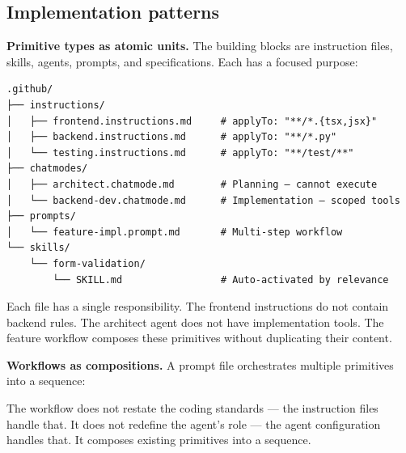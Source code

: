 \documentclass[
  a4paper,
  DIV=11,
  numbers=noendperiod]{scrreprt}
\newenvironment{Shaded}{\begin{snugshade}}{\end{snugshade}}
\newcommand{\CommentTok}[1]{\textcolor[rgb]{0.37,0.37,0.37}{#1}}
\newcommand{\FunctionTok}[1]{\textcolor[rgb]{0.28,0.35,0.67}{#1}}
\newcommand{\NormalTok}[1]{\textcolor[rgb]{0.00,0.23,0.31}{#1}}
\newcommand{\OtherTok}[1]{\textcolor[rgb]{0.00,0.23,0.31}{#1}}
\newcommand{\SpecialStringTok}[1]{\textcolor[rgb]{0.13,0.47,0.30}{#1}}
\begin{document}
\subsection{Implementation patterns}\label{implementation-patterns-2}

\textbf{Primitive types as atomic units.} The building blocks are
instruction files, skills, agents, prompts, and specifications. Each has
a focused purpose:

\begin{verbatim}
.github/
├── instructions/
│   ├── frontend.instructions.md     # applyTo: "**/*.{tsx,jsx}"
│   ├── backend.instructions.md      # applyTo: "**/*.py"
│   └── testing.instructions.md      # applyTo: "**/test/**"
├── chatmodes/
│   ├── architect.chatmode.md        # Planning — cannot execute
│   └── backend-dev.chatmode.md      # Implementation — scoped tools
├── prompts/
│   └── feature-impl.prompt.md       # Multi-step workflow
└── skills/
    └── form-validation/
        └── SKILL.md                 # Auto-activated by relevance
\end{verbatim}

Each file has a single responsibility. The frontend instructions do not
contain backend rules. The architect agent does not have implementation
tools. The feature workflow composes these primitives without
duplicating their content.

\textbf{Workflows as compositions.} A prompt file orchestrates multiple
primitives into a sequence:

\begin{Shaded}
\end{Shaded}

The workflow does not restate the coding standards --- the instruction
files handle that. It does not redefine the agent's role --- the agent
configuration handles that. It composes existing primitives into a
sequence.
\end{document}
